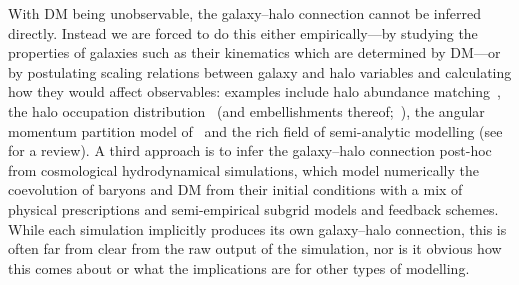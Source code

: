 \documentclass[usenatbib,useAMS]{mnras}
\begin{document}
With \ac{DM} being unobservable, the galaxy--halo connection cannot be inferred directly. Instead we are forced to do this either empirically---by studying the properties of galaxies such as their kinematics which are determined by \ac{DM}---or by postulating scaling relations between galaxy and halo variables and calculating how they would affect observables: examples include halo abundance matching~\citep{Kravtsov_2004,Behroozi_2010}, the halo occupation distribution~\citep{HOD} (and embellishments thereof;~\citealt{Paranjape_HOD, Decorated_HOD, Hadzhiyska_HOD}), the angular momentum partition model of~\cite{MMW_1998} and the rich field of semi-analytic modelling (see~\citealt{Baugh} for a review). A third approach is to infer the galaxy--halo connection post-hoc from cosmological hydrodynamical simulations, which model numerically the coevolution of baryons and \ac{DM} from their initial conditions with a mix of physical prescriptions and semi-empirical subgrid models and feedback schemes. While each simulation implicitly produces its own galaxy--halo connection, this is often far from clear from the raw output of the simulation, nor is it obvious how this comes about or what the implications are for other types of modelling.
\end{document}
